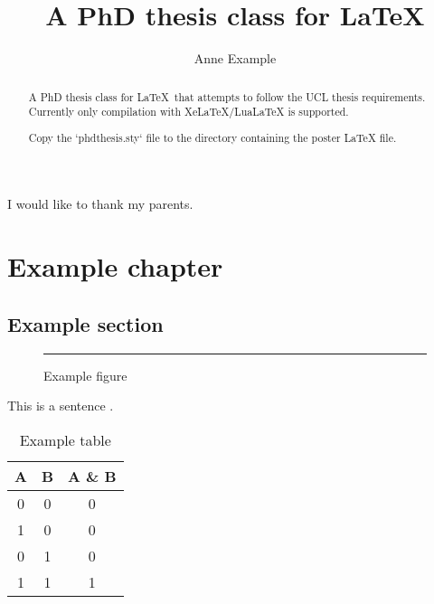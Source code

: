 \documentclass[]{phdthesis}
\title{A PhD thesis class for LaTeX}
\author{Anne Example}
\begin{document}
\maketitle

\begin{abstract}
	A PhD thesis class for \LaTeX\ that attempts to follow the UCL thesis requirements. Currently only compilation with XeLaTeX/LuaLaTeX is supported.
	
	Copy the `phdthesis.sty` file to the directory containing the poster LaTeX file.
\end{abstract}

\tableofcontents*

\listoffigures

\listoftables

\begin{acknowledgements}
	I would like to thank my parents.
\end{acknowledgements}

\chapter{Example chapter}

\section{Example section}

\begin{figure}[t]
	\centering
	\textcolor{gray}{\rule{6cm}{3cm}}
	\caption{Example figure}
\end{figure}

This is a sentence \autocite{pervisor2015}. \lipsum[1-8] %

\begin{table}[t]
	\centering
	\begin{tabular}{ccc}
		\toprule A&B&A \& B\\\midrule0&0&0\\1&0&0\\0&1&0\\1&1&1\\\bottomrule
	\end{tabular}
	\caption{Example table}
\end{table}

\lipsum[9-13] 

\printbibliography
\end{document}
